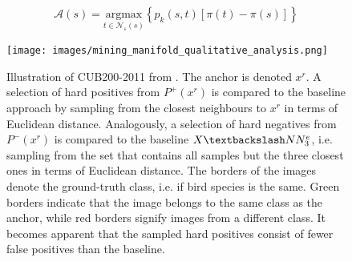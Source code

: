 \begin{equation}
    \mathcal{A}(s) = \underset{t \in \mathcal{N_\varepsilon}(s)}{\text{argmax}} \left\{ p_k(s,t)\left[ \pi(t)-\pi(s) \right] \right\}
    \label{eq:authority_ascent_shift}
\end{equation}



\begin{figure}[!htb] %
    \centering
    \texttt{[image: images/mining\_manifold\_qualitative\_analysis.png]}
    \caption{Illustration of CUB200-2011 from \citet{mining_manifolds_2018}.
    The anchor is denoted $x^r$.
    A selection of hard positives from $P^+(x^r)$ is compared to the 
    baseline approach by sampling from the closest neighbours to $x^r$ in 
    terms of Euclidean distance.
    Analogously, a selection of hard negatives from $P^-(x^r)$ 
    is compared to the baseline $X \textbackslash NN^e_3$, 
    i.e. sampling from the set that contains all samples but the three closest ones in 
    terms of Euclidean distance.
    The borders of the images denote the ground-truth class, i.e. if bird species is the same.
    Green borders indicate that the image belongs to the same class as the anchor, 
    while red borders signify images from a different class.
    It becomes apparent that the sampled hard positives consist of fewer false positives 
    than the baseline.
    }
    \label{fig:manifold_mining_qualitative_analysis}
\end{figure}

